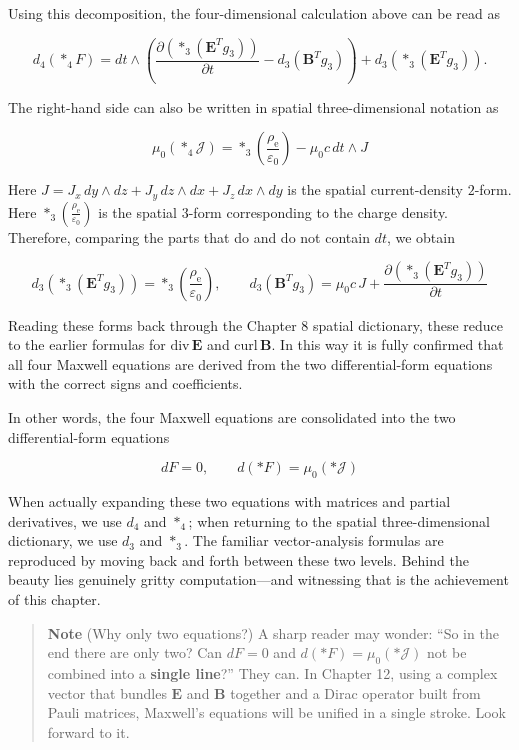 Using this decomposition, the four-dimensional calculation above can be
read as

\[
d_4(\ast_4F)
=
dt\wedge\left(
\frac{\partial(\ast_3(\mathbf E^Tg_3))}{\partial t}
-
d_3(\mathbf B^Tg_3)
\right)
+
d_3(\ast_3(\mathbf E^Tg_3)).
\]

The right-hand side can also be written in spatial three-dimensional
notation as

\[
\mu_0(\ast_4\mathcal J)=\ast_3\left(\frac{\rho_{\mathrm e}}{\varepsilon_0}\right)-\mu_0 c\,dt\wedge J
\]

Here \(J=J_x\,dy\wedge dz+J_y\,dz\wedge dx+J_z\,dx\wedge dy\) is the
spatial current-density \(2\)-form. Here
\(\ast_3\left(\frac{\rho_{\mathrm e}}{\varepsilon_0}\right)\) is the
spatial \(3\)-form corresponding to the charge density. Therefore,
comparing the parts that do and do not contain \(dt\), we obtain

\[
d_3(\ast_3(\mathbf E^Tg_3))=\ast_3\left(\frac{\rho_{\mathrm e}}{\varepsilon_0}\right),
\qquad
d_3(\mathbf B^Tg_3)=\mu_0 c\,J+\frac{\partial(\ast_3(\mathbf E^Tg_3))}{\partial t}
\]

Reading these forms back through the Chapter 8 spatial dictionary, these
reduce to the earlier formulas for \(\mathrm{div}\,\mathbf E\) and
\(\mathrm{curl}\,\mathbf B\). In this way it is fully confirmed that all
four Maxwell equations are derived from the two differential-form
equations with the correct signs and coefficients.

In other words, the four Maxwell equations are consolidated into the two
differential-form equations

\[dF = 0, \qquad d(\ast F) = \mu_0(\ast\mathcal{J})\]

When actually expanding these two equations with matrices and partial
derivatives, we use \(d_4\) and \(\ast_4\); when returning to the
spatial three-dimensional dictionary, we use \(d_3\) and \(\ast_3\). The
familiar vector-analysis formulas are reproduced by moving back and
forth between these two levels. Behind the beauty lies genuinely gritty
computation---and witnessing that is the achievement of this chapter.

\begin{quote}
\textbf{Note} (Why only two equations?) A sharp reader may wonder: ``So
in the end there are only two? Can \(dF=0\) and
\(d(\ast F)=\mu_0(\ast\mathcal{J})\) not be combined into a
\textbf{single line}?'' They can. In Chapter 12, using a complex vector
that bundles \(\mathbf{E}\) and \(\mathbf{B}\) together and a Dirac
operator built from Pauli matrices, Maxwell's equations will be unified
in a single stroke. Look forward to it.
\end{quote}

